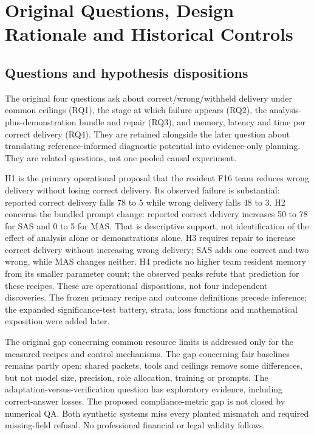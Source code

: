 \section{Original Questions, Design Rationale and Historical Controls}\label{sec:design-restored}
\subsection{Questions and hypothesis dispositions}
The original four questions ask about correct/wrong/withheld delivery under common ceilings (RQ1), the stage at which failure appears (RQ2), the analysis-plus-demonstration bundle and repair (RQ3), and memory, latency and time per correct delivery (RQ4). They are retained alongside the later question about translating reference-informed diagnostic potential into evidence-only planning. They are related questions, not one pooled causal experiment.

H1 is the primary operational proposal that the resident F16 team reduces wrong delivery without losing correct delivery. Its observed failure is substantial: reported correct delivery falls 78 to 5 while wrong delivery falls 48 to 3. H2 concerns the bundled prompt change: reported correct delivery increases 50 to 78 for SAS and 0 to 5 for MAS. That is descriptive support, not identification of the effect of analysis alone or demonstrations alone. H3 requires repair to increase correct delivery without increasing wrong delivery; SAS adds one correct and two wrong, while MAS changes neither. H4 predicts no higher team resident memory from its smaller parameter count; the observed peaks refute that prediction for these recipes. These are operational dispositions, not four independent discoveries. The frozen primary recipe and outcome definitions precede inference; the expanded significance-test battery, strata, loss functions and mathematical exposition were added later.

The original gap concerning common resource limits is addressed only for the measured recipes and control mechanisms. The gap concerning fair baselines remains partly open: shared packets, tools and ceilings remove some differences, but not model size, precision, role allocation, training or prompts. The adaptation-versus-verification question has exploratory evidence, including correct-answer losses. The proposed compliance-metric gap is not closed by numerical QA. Both synthetic systems miss every planted mismatch and required missing-field refusal. No professional financial or legal validity follows.

